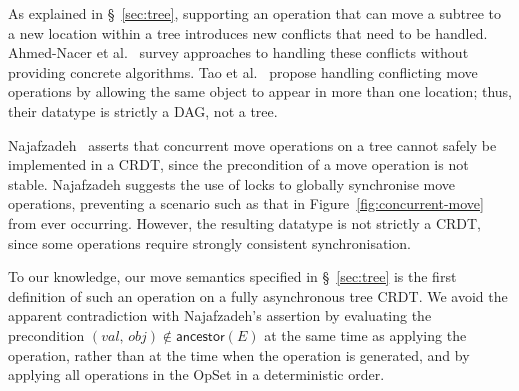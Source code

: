 As explained in \S~\ref{sec:tree}, supporting an operation that can move a subtree to a new location within a tree introduces new conflicts that need to be handled.
Ahmed-Nacer et al.~\cite{AhmedNacer:2012us} survey approaches to handling these conflicts without providing concrete algorithms.
Tao et al.~\cite{Tao:2015gd} propose handling conflicting move operations by allowing the same object to appear in more than one location; thus, their datatype is strictly a DAG, not a tree.

Najafzadeh~\cite{Najafzadeh:2017vk,Najafzadeh:2018bw} asserts that concurrent move operations on a tree cannot safely be implemented in a CRDT, since the precondition of a move operation is not stable.
Najafzadeh suggests the use of locks to globally synchronise move operations, preventing a scenario such as that in Figure~\ref{fig:concurrent-move} from ever occurring.
However, the resulting datatype is not strictly a CRDT, since some operations require strongly consistent synchronisation.

To our knowledge, our move semantics specified in \S~\ref{sec:tree} is the first definition of such an operation on a fully asynchronous tree CRDT.
We avoid the apparent contradiction with Najafzadeh's assertion by evaluating the precondition $(\mathit{val},\, \mathit{obj}) \notin \mathsf{ancestor}(E)$ at the same time as applying the operation, rather than at the time when the operation is generated, and by applying all operations in the OpSet in a deterministic order.

